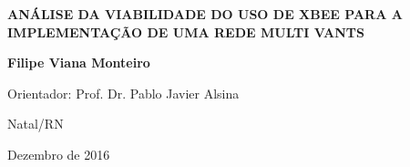 \begin{titlepage}
\begin{center}
\vfill

\LARGE

\textbf{ANÁLISE DA VIABILIDADE DO USO DE XBEE PARA A IMPLEMENTAÇÃO DE UMA REDE MULTI VANTS}

\vfill

\Large

\textbf{Filipe Viana Monteiro}

\vfill
%
\normalsize

Orientador: Prof. Dr. Pablo Javier Alsina

\vfill




\vfill

\large

Natal/RN

Dezembro de 2016

\end{center}

\end{titlepage}

